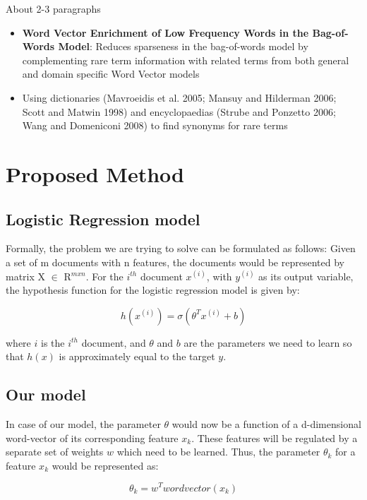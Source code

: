 About 2-3 paragraphs
\begin{itemize}
\item \textbf{Word Vector Enrichment of Low Frequency Words in the Bag-of-Words Model}: Reduces sparseness in the bag-of-words model by complementing rare term information with related terms from both general and domain specific Word Vector models

\item Using  dictionaries (Mavroeidis  et al. 2005;
Mansuy and Hilderman  2006;  Scott and  Matwin 1998)
and encyclopaedias (Strube and Ponzetto 2006; Wang and
Domeniconi 2008) to find synonyms for rare terms

\end{itemize}


\chapter{Proposed Method}

\section{Logistic Regression model}

Formally, the problem we are trying to solve can be formulated as follows: Given a set of m documents with n features, the documents would be represented by matrix X $\in$ R$^{m x n}$. For the $i^{th}$ document $x^{(i)}$, with $y^{(i)}$ as its output variable, the hypothesis function for the logistic regression model is given by:


$$h(x^{(i)}) = \sigma(\theta^{T}x^{(i)} + b)$$

where $i$ is the $i^{th}$ document, and $\theta$ and $b$ are the parameters we need to learn so that $h(x)$ is approximately equal to the target $y$.


\section{Our model}

In case of our model, the parameter $\theta$ would now be a function of a d-dimensional word-vector of its corresponding feature $x_{k}$. These features will be regulated by a separate set of weights $w$ which need to be learned. Thus, the parameter $\theta_{k}$ for a feature $x_{k}$ would be represented as:

$$\theta_{k} = w^{T} wordvector(x_{k})$$

